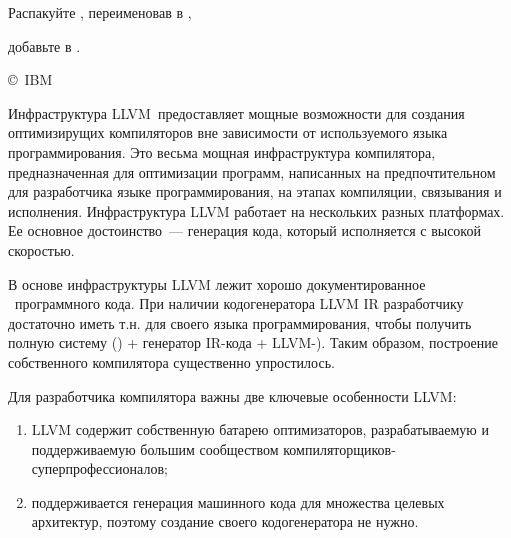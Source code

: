 \secdown



\bigskip
Распакуйте , переименовав в
, 

добавьте  в . 


\copyright\ IBM


\bigskip
Инфраструктура LLVM\ предоставляет мощные возможности для создания оптимизирущих
компиляторов вне зависимости от используемого языка программирования.
Это весьма мощная инфраструктура компилятора, предназначенная для оптимизации
программ, написанных на предпочтительном для разработчика языке
программирования, на этапах компиляции, связывания и исполнения. Инфраструктура
LLVM работает на нескольких разных платформах. Ее основное достоинство\ ---
генерация кода, который исполняется с высокой скоростью.

В основе инфраструктуры LLVM лежит хорошо документированное
\ программного кода.
При наличии кодогенератора LLVM IR разработчику достаточно иметь т.н.
 для своего языка программирования,
чтобы получить полную систему  () + генератор
IR-кода + LLVM-). Таким образом, построение
собственного компилятора существенно упростилось.

Для разработчика компилятора важны две ключевые особенности LLVM:

\begin{enumerate}
  \item LLVM содержит собственную батарею оптимизаторов, разрабатываемую и
  поддерживаемую большим сообществом компиляторщиков-суперпрофессионалов;
  \item поддерживается генерация машинного кода для множества целевых
  архитектур, поэтому создание своего кодогенератора не нужно.
\end{enumerate}

